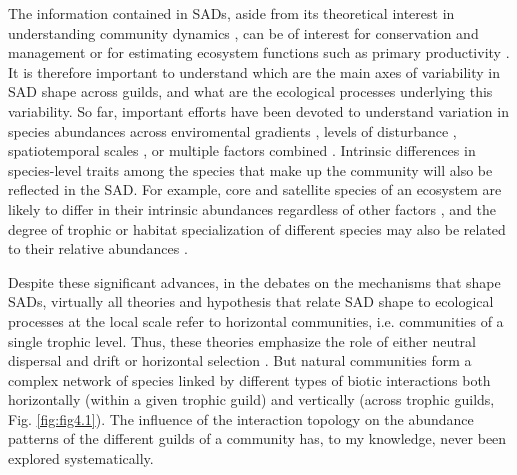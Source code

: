 The information contained in SADs, aside from its theoretical interest in understanding community dynamics \citep{Hillebrand2008}, can be of interest for conservation and management \citep{Matthews2015} or for estimating ecosystem functions such as primary productivity \citep{Wilsey2000}. It is therefore important to understand which are the main axes of variability in SAD shape across guilds, and what are the ecological processes underlying this variability. So far, important efforts have been devoted to understand variation in species abundances across enviromental gradients \citep{Ulrich2016, Passy2016}, levels of disturbance \citep{Komonen2017}, spatiotemporal scales \citep{Borda-de-Agua2012}, or multiple factors combined \citep{Arellano2017}. Intrinsic differences in species-level traits among the species that make up the community will also be reflected in the SAD. For example, core and satellite species of an ecosystem are likely to differ in their intrinsic abundances regardless of other factors \citep{Magurran2003}, and the degree of trophic or habitat specialization of different species may also be related to their relative abundances \citep{Labra2005, Matthews2015}.

Despite these significant advances, in the debates on the mechanisms that shape SADs, virtually all theories and hypothesis that relate SAD shape to ecological processes at the local scale refer to horizontal communities, i.e. communities of a single trophic level. Thus, these theories emphasize the role of either neutral dispersal and drift \citep{Hubbell2001} or horizontal selection \citep{Vellend2016}. But natural communities form a complex network of species linked by different types of biotic interactions both horizontally (within a given trophic guild) and vertically (across trophic guilds, Fig. \ref{fig:fig4.1}). The influence of the interaction topology on the abundance patterns of the different guilds of a community has, to my knowledge, never been explored systematically.

